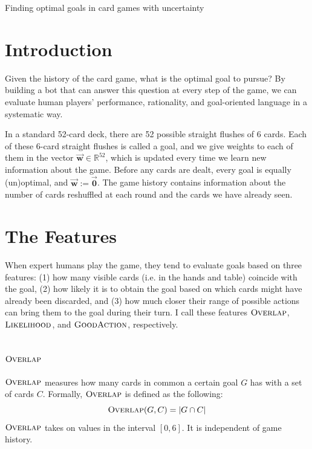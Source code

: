 \documentclass[11pt]{article}
\newcommand{\bvec}[1]{\vec{\mathbf{#1}}}
\newcommand{\R}{\mathbb{R}}
\newcommand{\overlap}{\textsc{Overlap}}
\newcommand{\lkhd}{\textsc{Likelihood}}
\newcommand{\goodaction}{\textsc{GoodAction}}
\begin{document}
\begin{center}
\Large{Finding optimal goals in card games with uncertainty}
\end{center}

\section{Introduction}

Given the history of the card game, what is the optimal goal to pursue? By building a bot that can answer this question at every step of the game, we can evaluate human players' performance, rationality, and goal-oriented language in a systematic way.

In a standard 52-card deck, there are 52 possible straight flushes of 6 cards. Each of these 6-card straight flushes is called a goal, and we give weights to each of them in the vector $\bvec{w} \in \R^{52}$, which is updated every time we learn new information about the game. Before any cards are dealt, every goal is equally (un)optimal, and $\bvec{w} := \bvec{0}$. The game history contains information about the number of cards reshuffled at each round and the cards we have already seen.

\section{The Features}

When expert humans play the game, they tend to evaluate goals based on three features: (1) how many visible cards (i.e. in the hands and table) coincide with the goal, (2) how likely it is to obtain the goal based on which cards might have already been discarded, and (3) how much closer their range of possible actions can bring them to the goal during their turn. I call these features $\overlap$, $\lkhd$, and $\goodaction$, respectively.

\subsection{$\overlap$}

$\overlap$ measures how many cards in common a certain goal $G$ has with a set of cards $C$. Formally, $\overlap$ is defined as the following:
\begin{equation}
\overlap(G,C) = |G \cap C|
\label{eq:overlap} \end{equation}
$\overlap$ takes on values in the interval $[0,6]$. It is independent of game history.
\end{document}
